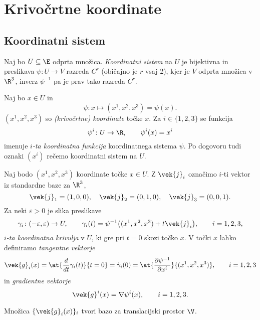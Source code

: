 \section{Krivočrtne koordinate} \label{s:koordinate}


\subsection{Koordinatni sistem}


\begin{definicija}
	Naj bo $U\subseteq\E$ odprta množica. \emph{Koordinatni sistem} na $U$ je bijektivna in
	preslikava $\psi\colon U\to V$ razreda $C^r$ (običajno je $r$ vsaj 2), kjer je $V$ odprta
	množica v $\R^3$, inverz $\psi^{-1}$ pa je prav tako razreda $C^r$.
\end{definicija}

Naj bo $x\in U$ in
\[ \psi\colon x\mapsto (x^1,x^2,x^3)=\psi(x). \]
$(x^1,x^2,x^3)$ so \emph{(krivočrtne) koordinate} točke $x$.
Za $i\in\{1,2,3\}$ se funkcija
\[ \psi^i\colon U\to\R,\qquad \psi^i(x)=x^i \]
imenuje \emph{$i$-ta koordinatna funkcija} koordinatnega sistema $\psi$.
Po dogovoru tudi oznaki $(x^i)$ rečemo koordinatni sistem na $U$.

Naj bodo $(x^1,x^2,x^3)$ koordinate točke $x\in U$. Z $\vek{j}_i$ označimo
$i$-ti vektor iz standardne baze za $\R^3$,
\[ \vek{j}_1=(1,0,0),\quad\vek{j}_2=(0,1,0),\quad\vek{j}_3=(0,0,1). \]
Za neki $\varepsilon>0$ je slika preslikave
\begin{equation} \label{e:kokri}
	\gamma_i\colon(-\varepsilon,\varepsilon)\to U,\qquad
	\gamma_i(t)=\psi^{-1}\big((x^1,x^2,x^3)+t\vek{j}_i\big),\qquad i=1,2,3,
\end{equation}
\emph{$i$-ta koordinatna krivulja} v $U$, ki gre pri $t=0$ skozi točko $x$.
V točki $x$ lahko definiramo \emph{tangentne vektorje}
\begin{equation} \label{e:tanvek}
	\vek{g}_i(x)=\at{\frac{d}{dt}\gamma_i(t)}{t=0}=\dot{\gamma}_i(0)
	=\at{\frac{\partial\psi^{-1}}{\partial x^i}}{(x^1,x^2,x^3)}
	, \qquad i=1,2,3
\end{equation}
in \emph{gradientne vektorje}
\begin{equation} \label{e:gradvek}
	\vek{g}^i(x)=\nabla\psi^i(x),\qquad i=1,2,3.
\end{equation}

\begin{trditev}
	Množica $\{\vek{g}_i(x)\}_i$ tvori bazo za translacijski prostor $\V$.
\end{trditev}

